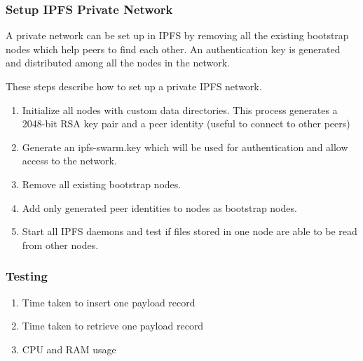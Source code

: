 \documentclass[11pt,openright]{report}
\begin{document}
\subsubsection{Setup IPFS Private Network}
A private network can be set up in IPFS by removing all the existing bootstrap nodes which help peers to find each other. An authentication key is generated and distributed among all the nodes in the network.

These steps describe how to set up a private IPFS network.
\begin{enumerate}
    \item Initialize all nodes with custom data directories. This process generates a 2048-bit RSA key pair and a peer identity (useful to connect to other peers)
    \item Generate an ipfs-swarm.key which will be used for authentication and allow access to the network.
    \item Remove all existing bootstrap nodes.
    \item Add only generated peer identities to nodes as bootstrap nodes.
    \item Start all IPFS daemons and test if files stored in one node are able to be read from other nodes.
\end{enumerate}

\subsubsection{Testing}
\begin{enumerate}
    \item Time taken to insert one payload record
    \item Time taken to retrieve one payload record
    \item CPU and RAM usage
\end{enumerate}

\end{document}
